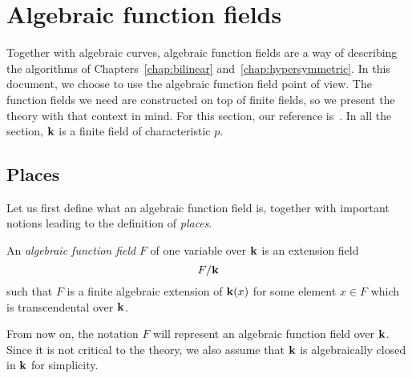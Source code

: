 \section{Algebraic function fields}
\label{sec:algebraic-function-fields}

%

Together with algebraic curves, algebraic function fields are a way of
describing the algorithms of Chapters~\ref{chap:bilinear}
and~\ref{chap:hypersymmetric}. In this document, we choose to use the algebraic
function field point of view. The function fields we need are constructed
on top of finite fields, so we present the theory with that context in mind. For
this section, our reference is~\cite{Stichtenoth09}. In all the section, $\mathbf{k}$ is
a finite field of characteristic $p$.

\subsection{Places}

Let us first define what an algebraic function field is, together with important
notions leading to the definition of \emph{places}.
\begin{defi}
  An \emph{algebraic function field} $F$ of one variable over $\mathbf{k}$ is an
  extension field 
  \[
    F/\mathbf{k}
  \]
  such that $F$ is a finite algebraic extension of
  $\mathbf{k}(x)$ for some element $x\in F$ which is transcendental over $\mathbf{k}$.
\end{defi}
From now on, the notation $F$ will represent an algebraic function field over
$\mathbf{k}$. Since it is not critical to the theory, we also assume that $\mathbf{k}$ is
algebraically closed in $\mathbf{k}$ for simplicity.

